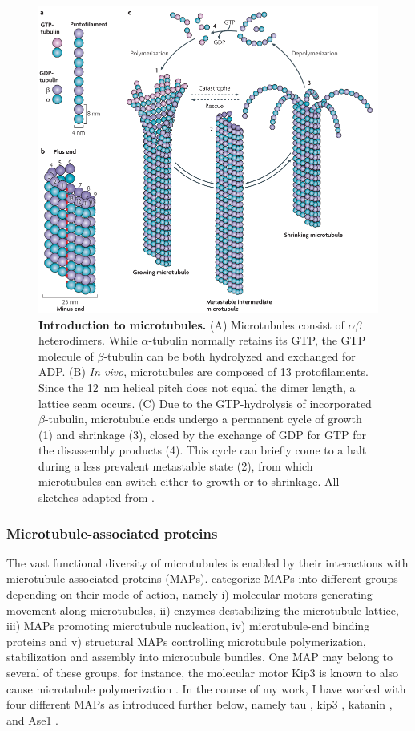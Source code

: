 \begin{figure}[h!tb]
\centering
\includegraphics[width=\linewidth]{Figures/MTintro.png}
\caption[Introduction to microtubules.]{\textbf{Introduction to microtubules.}
(A) Microtubules consist of $\alpha\beta$ heterodimers. While $\alpha$-tubulin normally retains its GTP, the GTP molecule of $\beta$-tubulin can be both hydrolyzed and exchanged for ADP. (B) \textit{In vivo}, microtubules are composed of 13 protofilaments. Since the \SI{12}{\nm} helical pitch does not equal the dimer length, a lattice seam occurs. (C) Due to the GTP-hydrolysis of incorporated $\beta$-tubulin, microtubule ends undergo a permanent cycle of growth (1) and shrinkage (3), closed by the exchange of GDP for GTP for the disassembly products (4). This cycle can briefly come to a halt during a less prevalent metastable state (2), from which microtubules can switch either to growth or to shrinkage. All sketches adapted from \cite{Akhmanova2008}.
	}\label{MTintro}
\end{figure}
 \FloatBarrier

\subsubsection{Microtubule-associated proteins}
\label{sec:MAPs}
The vast functional diversity of microtubules is enabled by their interactions with microtubule-associated proteins (MAPs). \cite{BODAKUNTLA2019804} categorize MAPs into different groups depending on their mode of action, namely i) molecular motors generating movement along microtubules, ii) enzymes destabilizing the microtubule lattice, iii) MAPs promoting microtubule nucleation, iv) microtubule-end binding proteins and v) structural MAPs controlling microtubule polymerization, stabilization and assembly into microtubule bundles. One MAP may belong to several of these groups, for instance, the molecular motor Kip3 is known to also cause microtubule polymerization \parencite{Gardner2011a}. In the course of my work, I have worked with four different MAPs as introduced further below, namely tau , kip3 , katanin , and Ase1 . 

